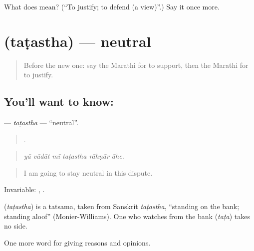 \begin{tcolorbox}[breakable,colback=teal!4,colframe=teal!35!black,title={Before you move on}]
What does   mean? (\textquotedblleft{}To justify; to defend (a view)\textquotedblright{}.) Say it once more.
\end{tcolorbox}
\section[\texorpdfstring{\mr{तटस्थ} (taṭastha)}{तटस्थ (taṭastha)}]{ (taṭastha) — neutral}

\label{lesson:MR-C347-tatastha}



\begin{quote}
Before the new one: say the Marathi for to support, then the Marathi for to justify.
\end{quote}

\subsection*{You'll want to know: }
\textbf{} — \emph{taṭastha} — \textquotedblleft{}neutral\textquotedblright{}.

\begin{quote}
     .
\end{quote}

\begin{quote}
\emph{yā vādāt mī taṭastha rāhṇār āhe.}
\end{quote}

\begin{quote}
I am going to stay neutral in this dispute.
\end{quote}

Invariable:   ,   .

\begin{cousinweb}
\textbf{} (\emph{taṭastha}) is a tatsama, taken from Sanskrit \emph{taṭastha}, \textquotedblleft{}standing on the bank; standing aloof\textquotedblright{} (Monier-Williams). One who watches from the bank (\emph{taṭa}) takes no side.
\end{cousinweb}

\begin{grammarlens}[title={What you've built}]
One more word for giving reasons and opinions.
\end{grammarlens}

